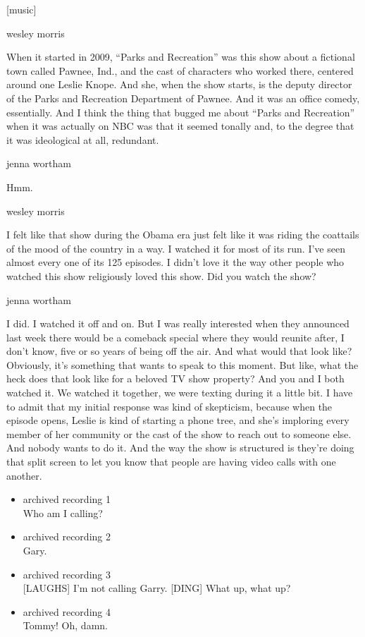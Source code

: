 {[}music{]}

wesley morris

When it started in 2009, ``Parks and Recreation'' was this show about a
fictional town called Pawnee, Ind., and the cast of characters who
worked there, centered around one Leslie Knope. And she, when the show
starts, is the deputy director of the Parks and Recreation Department of
Pawnee. And it was an office comedy, essentially. And I think the thing
that bugged me about ``Parks and Recreation'' when it was actually on
NBC was that it seemed tonally and, to the degree that it was
ideological at all, redundant.

jenna wortham

Hmm.

wesley morris

I felt like that show during the Obama era just felt like it was riding
the coattails of the mood of the country in a way. I watched it for most
of its run. I've seen almost every one of its 125 episodes. I didn't
love it the way other people who watched this show religiously loved
this show. Did you watch the show?

jenna wortham

I did. I watched it off and on. But I was really interested when they
announced last week there would be a comeback special where they would
reunite after, I don't know, five or so years of being off the air. And
what would that look like? Obviously, it's something that wants to speak
to this moment. But like, what the heck does that look like for a
beloved TV show property? And you and I both watched it. We watched it
together, we were texting during it a little bit. I have to admit that
my initial response was kind of skepticism, because when the episode
opens, Leslie is kind of starting a phone tree, and she's imploring
every member of her community or the cast of the show to reach out to
someone else. And nobody wants to do it. And the way the show is
structured is they're doing that split screen to let you know that
people are having video calls with one another.

\begin{itemize}
\item
  archived recording 1\\
  Who am I calling?
\item
  archived recording 2\\
  Gary.
\item
  archived recording 3\\
  {[}LAUGHS{]} I'm not calling Garry. {[}DING{]} What up, what up?
\item
  archived recording 4\\
  Tommy! Oh, damn.
\end{itemize}

